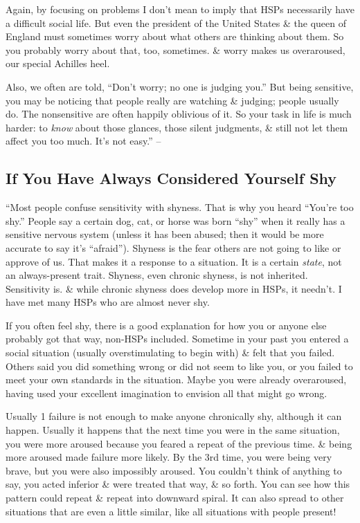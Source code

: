 \documentclass{article}
\numberwithin{equation}{section}
\begin{document}
Again, by focusing on problems I don't mean to imply that HSPs necessarily have a difficult social life. But even the president of the United States \& the queen of England must sometimes worry about what others are thinking about them. So you probably worry about that, too, sometimes. \& worry makes us overaroused, our special Achilles heel.

Also, we often are told, ``Don't worry; no one is judging you.'' But being sensitive, you may be noticing that people really are watching \& judging; people usually do. The nonsensitive are often happily oblivious of it. So your task in life is much harder: to \textit{know} about those glances, those silent judgments, \& still not let them affect you too much. It's not easy.'' -- \cite[p. 122]{Aron2013}

\subsection{If You Have Always Considered Yourself Shy}
``Most people confuse sensitivity with shyness. That is why you heard ``You're too shy.'' People say a certain dog, cat, or horse was born ``shy'' when it really has a sensitive nervous system (unless it has been abused; then it would be more accurate to say it's ``afraid''). Shyness is the fear others are not going to like or approve of us. That makes it a response to a situation. It is a certain \textit{state}, not an always-present trait. Shyness, even chronic shyness, is not inherited. Sensitivity is. \& while chronic shyness does develop more in HSPs, it needn't. I have met many HSPs who are almost never shy.

If you often feel shy, there is a good explanation for how you or anyone else probably got that way, non-HSPs included. Sometime in your past you entered a social situation (usually overstimulating to begin with) \& felt that you failed. Others said you did something wrong or did not seem to like you, or you failed to meet your own standards in the situation. Maybe you were already overaroused, having used your excellent imagination to envision all that might go wrong.

Usually 1 failure is not enough to make anyone chronically shy, although it can happen. Usually it happens that the next time you were in the same situation, you were more aroused because you feared a repeat of the previous time. \& being more aroused made failure more likely. By the 3rd time, you were being very brave, but you were also impossibly aroused. You couldn't think of anything to say, you acted inferior \& were treated that way, \& so forth. You can see how this pattern could repeat \& repeat into downward spiral. It can also spread to other situations that are even a little similar, like all situations with people present!
\end{document}
